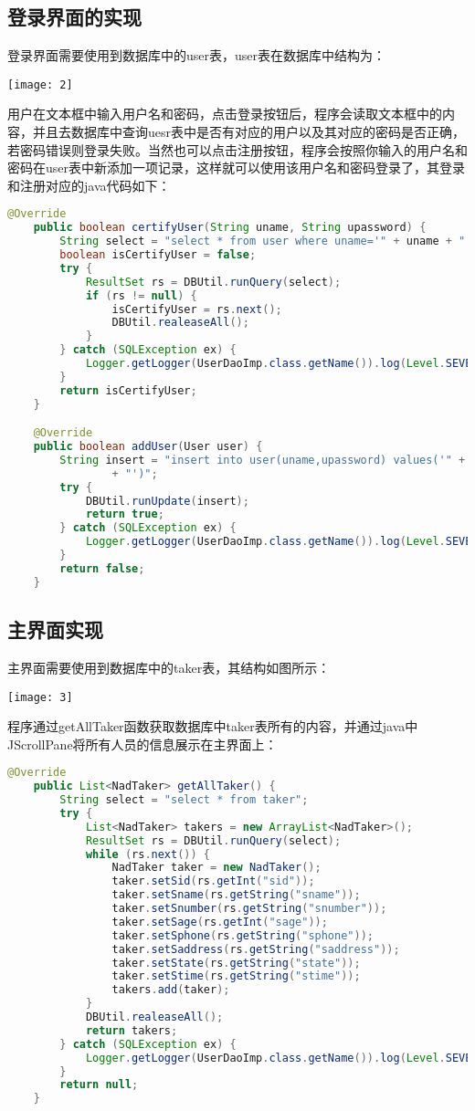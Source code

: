 \documentclass{article}
\begin{document}
\subsection{登录界面的实现}
登录界面需要使用到数据库中的user表，user表在数据库中结构为：
\begin{center}
   \texttt{[image: 2]}
\end{center}

用户在文本框中输入用户名和密码，点击登录按钮后，程序会读取文本框中的内容，并且去数据库中查询uesr表中是否有对应的用户以及其对应的密码是否正确，若密码错误则登录失败。当然也可以点击注册按钮，程序会按照你输入的用户名和密码在user表中新添加一项记录，这样就可以使用该用户名和密码登录了，其登录和注册对应的java代码如下：

\begin{lstlisting}[language = java]
   @Override
	public boolean certifyUser(String uname, String upassword) {
		String select = "select * from user where uname='" + uname + "' and upassword='" + upassword + "'";
		boolean isCertifyUser = false;
		try {
			ResultSet rs = DBUtil.runQuery(select);
			if (rs != null) {
				isCertifyUser = rs.next();
				DBUtil.realeaseAll();
			}
		} catch (SQLException ex) {
			Logger.getLogger(UserDaoImp.class.getName()).log(Level.SEVERE, null, ex);
		}
		return isCertifyUser;
	}

	@Override
	public boolean addUser(User user) {
		String insert = "insert into user(uname,upassword) values('" + user.getUname() + "','" + user.getUpassword()
				+ "')";
		try {
			DBUtil.runUpdate(insert);
			return true;
		} catch (SQLException ex) {
			Logger.getLogger(UserDaoImp.class.getName()).log(Level.SEVERE, null, ex);
		}
		return false;
	}
\end{lstlisting}

\subsection{主界面实现}
主界面需要使用到数据库中的taker表，其结构如图所示：
\begin{center}
   \texttt{[image: 3]}
\end{center}

程序通过getAllTaker函数获取数据库中taker表所有的内容，并通过java中JScrollPane将所有人员的信息展示在主界面上：
\begin{lstlisting}[language = java]
   @Override
	public List<NadTaker> getAllTaker() {
		String select = "select * from taker";
		try {
			List<NadTaker> takers = new ArrayList<NadTaker>();
			ResultSet rs = DBUtil.runQuery(select);
			while (rs.next()) {
				NadTaker taker = new NadTaker();
				taker.setSid(rs.getInt("sid"));
				taker.setSname(rs.getString("sname"));
				taker.setSnumber(rs.getString("snumber"));
				taker.setSage(rs.getInt("sage"));
				taker.setSphone(rs.getString("sphone"));
				taker.setSaddress(rs.getString("saddress"));
				taker.setState(rs.getString("state"));
				taker.setStime(rs.getString("stime"));
				takers.add(taker);
			}
			DBUtil.realeaseAll();
			return takers;
		} catch (SQLException ex) {
			Logger.getLogger(UserDaoImp.class.getName()).log(Level.SEVERE, null, ex);
		}
		return null;
	}
\end{lstlisting}
\end{document}
